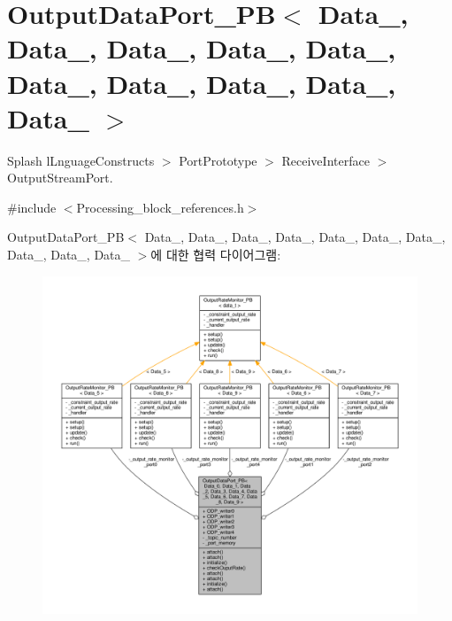 \hypertarget{classOutputDataPort__PB}{}\section{Output\+Data\+Port\+\_\+\+PB$<$ Data\+\_, Data\+\_, Data\+\_, Data\+\_, Data\+\_, Data\+\_, Data\+\_, Data\+\_, Data\+\_, Data\+\_ $>$}
\label{classOutputDataPort__PB}


Splash l\+Lnguage\+Constructs $>$ Port\+Prototype $>$ Receive\+Interface $>$ Output\+Stream\+Port.  




{\ttfamily \#include $<$Processing\+\_\+block\+\_\+references.\+h$>$}



Output\+Data\+Port\+\_\+\+PB$<$ Data\+\_, Data\+\_, Data\+\_, Data\+\_, Data\+\_, Data\+\_, Data\+\_, Data\+\_, Data\+\_, Data\+\_ $>$에 대한 협력 다이어그램\+:\nopagebreak
\begin{figure}[H]
\begin{center}
\leavevmode
\includegraphics[width=350pt]{classOutputDataPort__PB__coll__graph}
\end{center}
\end{figure}
